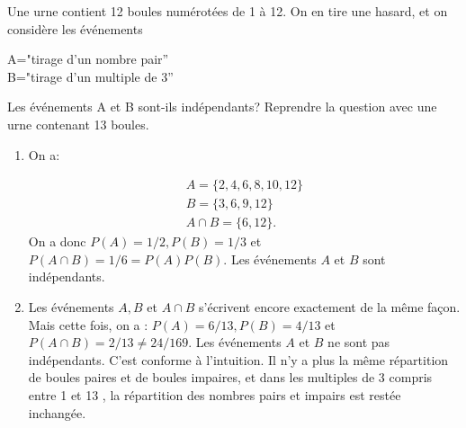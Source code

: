 



\begin{exercice}
 Une urne contient 12 boules numérotées de 1 à 12. On en tire une hasard, et on considère les événements
\begin{center}
A="tirage d'un nombre pair''\\
B="tirage d'un multiple de 3''
\end{center}
Les événements A et B sont-ils indépendants?
 Reprendre la question avec une urne contenant 13 boules.
\end{exercice}



\begin{correction}
\begin{enumerate}
  \item On a:

$$
\begin{gathered}
A=\{2,4,6,8,10,12\} \\
B=\{3,6,9,12\} \\
A \cap B=\{6,12\} .
\end{gathered}
$$
On a donc $P(A)=1 / 2, P(B)=1 / 3$ et $P(A \cap B)=1 / 6=P(A) P(B) .$ Les événements $A$ et $B$ sont indépendants.\\
\item  Les événements $A, B$ et $A \cap B$ s'écrivent encore exactement de la même façon. Mais cette fois, on a : $P(A)=6 / 13, P(B)=4 / 13$ et $P(A \cap B)=2 / 13 \neq 24 / 169$. Les événements $A$ et $B$ ne sont pas indépendants. C'est conforme à l'intuition. Il n'y a plus la même répartition de boules paires et de boules impaires, et dans les multiples de 3 compris entre 1 et 13 , la répartition des nombres pairs et impairs est restée inchangée.
\end{enumerate}
\end{correction}